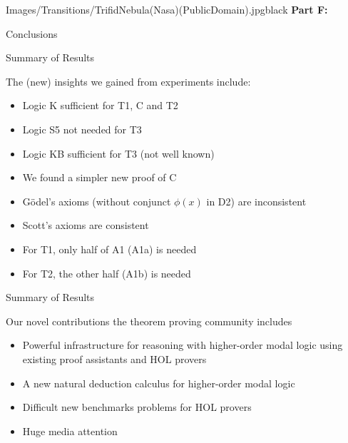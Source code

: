 
\begin{transitionframe}{Images/Transitions/TrifidNebula(Nasa)(PublicDomain).jpg}{black}
\textbf{Part F:}

Conclusions
\end{transitionframe}



\begin{frame}{Summary of Results} \large

The (\alert{new}) insights we gained from experiments include:\\[.5em]
\begin{itemize}
\item Logic K sufficient for T1, C and T2 
\item Logic S5 not needed for T3
\item \alert{Logic KB sufficient for T3 (not well known)}
\item \alert{We found a simpler new proof of C}
\item \alert{G\"odel's axioms (without conjunct $\phi(x)$ in D2) are inconsistent}
\item Scott's axioms are consistent
\item For T1, only half of A1 (A1a) is needed 
\item For T2, the other half (A1b) is needed
\end{itemize}
\end{frame}


\begin{frame}{Summary of Results} \large

Our novel contributions the  theorem proving community includes \\[.5em]
\begin{itemize}
\item Powerful infrastructure for reasoning with higher-order modal logic using existing proof assistants and HOL provers
\item A new natural deduction calculus for higher-order modal logic
\item Difficult new benchmarks problems for HOL provers
\item Huge media attention
\end{itemize}
\end{frame}

